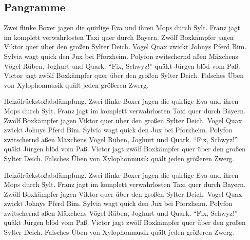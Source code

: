 \subsection{Pangramme}\label{subsec:pangramm}
Zwei flinke Boxer jagen die quirlige Eva und ihren Mops durch Sylt. Franz jagt im komplett verwahrlosten Taxi quer durch Bayern. Zwölf Boxkämpfer jagen Viktor quer über den großen Sylter Deich. Vogel Quax zwickt Johnys Pferd Bim. Sylvia wagt quick den Jux bei Pforzheim. Polyfon zwitschernd aßen Mäxchens Vögel Rüben, Joghurt und Quark. \enquote{Fix, Schwyz!} quäkt Jürgen blöd vom Paß. Victor jagt zwölf Boxkämpfer quer über den großen Sylter Deich. Falsches Üben von Xylophonmusik quält jeden größeren Zwerg.

Heizölrückstoßabdämpfung. Zwei flinke Boxer jagen die quirlige Eva und ihren Mops durch Sylt. Franz jagt im komplett verwahrlosten Taxi quer durch Bayern. Zwölf Boxkämpfer jagen Viktor quer über den großen Sylter Deich. Vogel Quax zwickt Johnys Pferd Bim. Sylvia wagt quick den Jux bei Pforzheim. Polyfon zwitschernd aßen Mäxchens Vögel Rüben, Joghurt und Quark. \enquote{Fix, Schwyz!} quäkt Jürgen blöd vom Paß. Victor jagt zwölf Boxkämpfer quer über den großen Sylter Deich. Falsches Üben von Xylophonmusik quält jeden größeren Zwerg.

Heizölrückstoßabdämpfung. Zwei flinke Boxer jagen die quirlige Eva und ihren Mops durch Sylt. Franz jagt im komplett verwahrlosten Taxi quer durch Bayern. Zwölf Boxkämpfer jagen Viktor quer über den großen Sylter Deich. Vogel Quax zwickt Johnys Pferd Bim. Sylvia wagt quick den Jux bei Pforzheim. Polyfon zwitschernd aßen Mäxchens Vögel Rüben, Joghurt und Quark. \enquote{Fix, Schwyz!} quäkt Jürgen blöd vom Paß. Victor jagt zwölf Boxkämpfer quer über den großen Sylter Deich. Falsches Üben von Xylophonmusik quält jeden größeren Zwerg.


